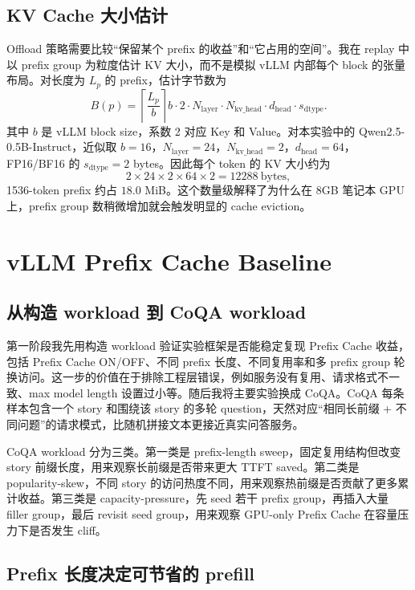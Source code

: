 \documentclass[UTF8,a4paper,10pt]{ctexart}
\begin{document}
\subsection{KV Cache 大小估计}

Offload 策略需要比较“保留某个 prefix 的收益”和“它占用的空间”。我在 replay 中以 prefix group 为粒度估计 KV 大小，而不是模拟 vLLM 内部每个 block 的张量布局。对长度为 $L_p$ 的 prefix，估计字节数为
\begin{equation}
B(p)=
\left\lceil \frac{L_p}{b} \right\rceil b
\cdot 2 \cdot N_{\mathrm{layer}} \cdot N_{\mathrm{kv\_head}}
\cdot d_{\mathrm{head}} \cdot s_{\mathrm{dtype}} .
\label{eq:kvbytes}
\end{equation}
其中 $b$ 是 vLLM block size，系数 2 对应 Key 和 Value。对本实验中的 Qwen2.5-0.5B-Instruct，近似取 $b=16$，$N_{\mathrm{layer}}=24$，$N_{\mathrm{kv\_head}}=2$，$d_{\mathrm{head}}=64$，FP16/BF16 的 $s_{\mathrm{dtype}}=2$ bytes。因此每个 token 的 KV 大小约为
\[
2 \times 24 \times 2 \times 64 \times 2 = 12288\ \mathrm{bytes},
\]
1536-token prefix 约占 $18.0$ MiB。这个数量级解释了为什么在 8GB 笔记本 GPU 上，prefix group 数稍微增加就会触发明显的 cache eviction。

\section{vLLM Prefix Cache Baseline}

\subsection{从构造 workload 到 CoQA workload}

第一阶段我先用构造 workload 验证实验框架是否能稳定复现 Prefix Cache 收益，包括 Prefix Cache ON/OFF、不同 prefix 长度、不同复用率和多 prefix group 轮换访问。这一步的价值在于排除工程层错误，例如服务没有复用、请求格式不一致、max model length 设置过小等。随后我将主要实验换成 CoQA。CoQA 每条样本包含一个 story 和围绕该 story 的多轮 question，天然对应“相同长前缀 + 不同问题”的请求模式，比随机拼接文本更接近真实问答服务。

CoQA workload 分为三类。第一类是 prefix-length sweep，固定复用结构但改变 story 前缀长度，用来观察长前缀是否带来更大 TTFT saved。第二类是 popularity-skew，不同 story 的访问热度不同，用来观察热前缀是否贡献了更多累计收益。第三类是 capacity-pressure，先 seed 若干 prefix group，再插入大量 filler group，最后 revisit seed group，用来观察 GPU-only Prefix Cache 在容量压力下是否发生 cliff。

\subsection{Prefix 长度决定可节省的 prefill}
\end{document}
